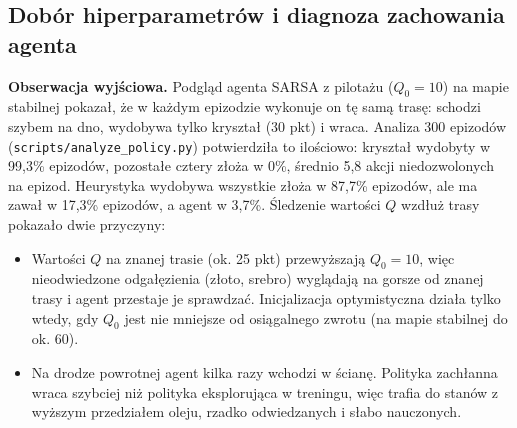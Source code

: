 \documentclass[11pt,a4paper]{article}
\begin{document}
\subsection{Dobór hiperparametrów i diagnoza zachowania agenta}\label{sec:dobor}
\textbf{Obserwacja wyjściowa.} Podgląd agenta SARSA z pilotażu ($Q_0=10$) na mapie
stabilnej pokazał, że w każdym epizodzie wykonuje on tę samą trasę: schodzi szybem na
dno, wydobywa tylko kryształ (30 pkt) i wraca. Analiza 300 epizodów
(\texttt{scripts/analyze\_policy.py}) potwierdziła to ilościowo: kryształ wydobyty
w 99,3\% epizodów, pozostałe cztery złoża w 0\%, średnio 5,8 akcji niedozwolonych na
epizod. Heurystyka wydobywa wszystkie złoża w 87,7\% epizodów, ale ma zawał w 17,3\%
epizodów, a agent w 3,7\%. Śledzenie wartości $Q$ wzdłuż trasy pokazało dwie
przyczyny:
\begin{itemize}
  \item Wartości $Q$ na znanej trasie (ok. 25 pkt) przewyższają $Q_0=10$, więc
  nieodwiedzone odgałęzienia (złoto, srebro) wyglądają na gorsze od znanej trasy
  i agent przestaje je sprawdzać. Inicjalizacja optymistyczna działa tylko wtedy,
  gdy $Q_0$ jest nie mniejsze od osiągalnego zwrotu (na mapie stabilnej do ok. 60).
  \item Na drodze powrotnej agent kilka razy wchodzi w ścianę. Polityka zachłanna
  wraca szybciej niż polityka eksplorująca w treningu, więc trafia do stanów
  z wyższym przedziałem oleju, rzadko odwiedzanych i słabo nauczonych.
\end{itemize}
\end{document}
